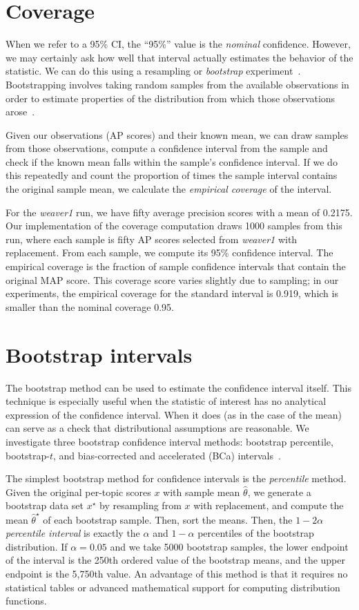\documentclass{sig-alt-release-2013}
\begin{document}
\section{Coverage}

When we refer to a 95\% CI, the ``95\%'' value is the {\em nominal} confidence.  However, we may certainly ask how well that interval actually estimates the behavior of the statistic.  We can do this using a resampling or {\em bootstrap} experiment~\cite{Schall12}.  Bootstrapping involves taking random samples from the available observations in order to estimate properties of the distribution from which those observations arose~\cite{Efron93}.

Given our observations (AP scores) and their known mean, we can draw samples from those observations, compute a confidence interval from the sample and check if the known mean falls within the sample's confidence interval.  If we do this repeatedly and count the proportion of times the sample interval contains the original sample mean, we calculate the {\em empirical coverage} of the interval.

For the {\em weaver1} run, we have fifty average precision scores with a mean of 0.2175.  Our implementation of the coverage computation draws 1000 samples from this run, where each sample is fifty AP scores selected from {\em weaver1} with replacement.  From each sample, we compute its 95\% confidence interval.  The empirical coverage is the fraction  of sample confidence intervals that contain the original MAP score.  This coverage score varies slightly due to sampling; in our experiments, the empirical coverage for the standard interval is 0.919, which is smaller than the nominal coverage 0.95.

\section{Bootstrap intervals}

The bootstrap method can be used to estimate the confidence interval itself.  This technique is especially useful when the statistic of interest has no analytical expression of the confidence interval.  When it does (as in the case of the mean) can serve as a check that distributional assumptions are reasonable.  We investigate three bootstrap confidence interval methods: bootstrap percentile, bootstrap-$t$, and bias-corrected and accelerated (BCa) intervals~\cite{Efron93}.

The simplest bootstrap method for confidence intervals is the {\em percentile} method.  Given the original per-topic scores $x$ with sample mean $\hat{\theta}$, we generate a bootstrap data set $x^\star$ by resampling from $x$ with replacement, and compute the mean $\hat{\theta}^\star$ of each bootstrap sample.  Then, sort the means.  Then, the $1 - 2\alpha$ {\em percentile interval} is exactly the $\alpha$ and $1-\alpha$ percentiles of the bootstrap distribution.  If $\alpha = 0.05$ and we take 5000 bootstrap samples, the lower endpoint of the interval is the 250th ordered value of the bootstrap means, and the upper endpoint is the 5,750th value.  An advantage of this method is that it requires no statistical tables or advanced mathematical support for computing distribution functions.
\end{document}
